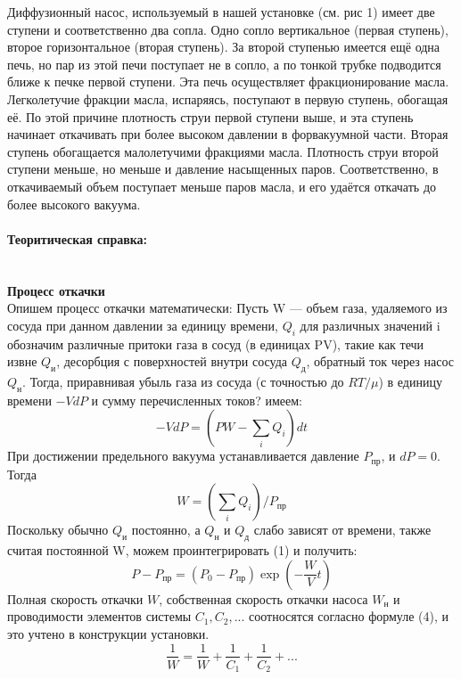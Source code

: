 \documentclass[a4paper, 12pt]{article}
\newcommand{\parag}[1]{\paragraph*{#1:}}
\begin{document}
Диффузионный насос, используемый в нашей установке (см. рис 1) имеет две ступени и соответственно два сопла. Одно сопло вертикальное (первая ступень), второе горизонтальное (вторая ступень). За второй ступенью имеется ещё одна печь, но пар из этой печи поступает не в сопло, а по тонкой трубке подводится ближе к печке первой ступени. Эта печь осуществляет фракционирование масла. Легколетучие фракции масла, испаряясь, поступают в первую ступень, обогащая её. По этой причине плотность струи первой ступени выше, и эта ступень начинает откачивать при более высоком давлении в форвакуумной части. Вторая ступень обогащается малолетучими фракциями масла. Плотность струи второй ступени меньше, но меньше и давление насыщенных паров. Соответственно, в откачиваемый объем поступает меньше паров масла, и его удаётся откачать до более высокого вакуума.  \\


\parag {Теоритическая справка} ~\\
\textbf{Процесс откачки}\\
Опишем процесс откачки математически: 
Пусть W --- объем газа, удаляемого из сосуда при данном давлении за единицу времени, $Q_i$ для различных значений i обозначим различные притоки газа в сосуд (в единицах PV), такие как течи извне $Q_\text{и}$, десорбция с поверхностей внутри сосуда $Q_\text{д}$, обратный ток через насос $Q_\text{н}$. Тогда, приравнивая убыль газа из сосуда (с точностью до $RT/\mu$) в единицу времени $-VdP$ и сумму перечисленных токов? имеем:
 \begin{equation}
 	-VdP = (PW - \sum_i Q_i)dt
 \end{equation}
 При достижении предельного вакуума устанавливается давление $P_{\text{пр}}$, и $dP = 0$. Тогда
 \begin{equation}
 	 W = ( \sum_i Q_i )/P_{\text{пр}}
 \end{equation}
 Поскольку обычно $Q_\text{и}$ постоянно, а $Q_\text{н}$ и $Q_\text{д}$ слабо зависят от времени, также считая постоянной W, можем проинтегрировать (1) и получить:
 \begin{equation}
 	P - P_{\text{пр}} = (P_0 - P_{\text{пр}})\exp(-\frac{W}{V}t)
 \end{equation}
Полная скорость откачки $W$, собственная скорость откачки насоса $W_{\text{н}}$ и проводимости элементов системы $C_1, C_2,...$ соотносятся согласно формуле (4), и это учтено в конструкции установки.
 \begin{equation}
 \frac{1}{W} = \frac{1}{W} + \frac{1}{C_1} + \frac{1}{C_2} + ...
\end{equation}
\end{document}
